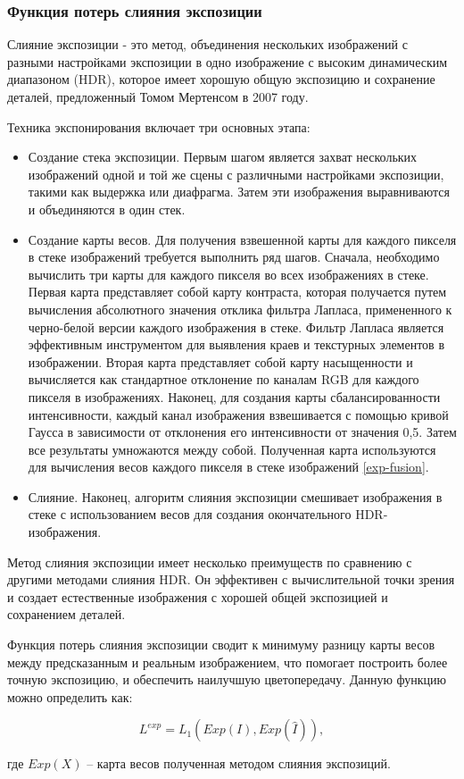 \subsubsection{Функция потерь слияния экспозиции}

Слияние экспозиции - это метод, объединения нескольких изображений с разными настройками экспозиции в одно изображение с высоким динамическим диапазоном (HDR), которое имеет хорошую общую экспозицию и сохранение деталей, предложенный Томом Мертенсом в 2007 году.

Техника экспонирования включает три основных этапа:

\begin{itemize}
    \item Создание стека экспозиции. Первым шагом является захват нескольких изображений одной и той же сцены с различными настройками экспозиции, такими как выдержка или диафрагма. Затем эти изображения выравниваются и объединяются в один стек.

    \item Создание карты весов. Для получения взвешенной карты для каждого пикселя в стеке изображений требуется выполнить ряд шагов. Сначала, необходимо вычислить три карты для каждого пикселя во всех изображениях в стеке. Первая карта представляет собой карту контраста, которая получается путем вычисления абсолютного значения отклика фильтра Лапласа, примененного к черно-белой версии каждого изображения в стеке. Фильтр Лапласа является эффективным инструментом для выявления краев и текстурных элементов в изображении. Вторая карта представляет собой карту насыщенности и вычисляется как стандартное отклонение по каналам RGB для каждого пикселя в изображениях. Наконец, для создания карты сбалансированности интенсивности, каждый канал изображения взвешивается с помощью кривой Гаусса в зависимости от отклонения его интенсивности от значения 0,5. Затем все результаты умножаются между собой. Полученная карта используются для вычисления весов каждого пикселя в стеке изображений \ref{exp-fusion}. 

    \item Слияние. Наконец, алгоритм слияния экспозиции смешивает изображения в стеке с использованием весов для создания окончательного HDR-изображения. 
\end{itemize}


Метод слияния экспозиции имеет несколько преимуществ по сравнению с другими методами слияния HDR. Он эффективен с вычислительной точки зрения и создает естественные изображения с хорошей общей экспозицией и сохранением деталей.

Функция потерь слияния экспозиции сводит к минимуму разницу карты весов между предсказанным и реальным изображением, что помогает построить более точную экспозицию, и обеспечить наилучшую цветопередачу. Данную функцию можно определить как:

\begin{equation}
    \label{eq:5-3-5}
    L^{exp} = L_1(Exp(I), Exp(\hat{I})),
\end{equation}

где $Exp(X)$ -- карта весов полученная методом слияния экспозиций.
